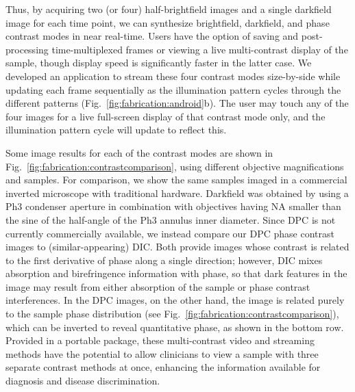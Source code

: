 Thus, by acquiring two (or four) half-brightfield images and a single darkfield image for each time point, we can synthesize brightfield, darkfield, and phase contrast modes in near real-time. Users have the option of saving and post-processing time-multiplexed frames or viewing a live multi-contrast display of the sample, though display speed is significantly faster in the latter case. We developed an application to stream these four contrast modes size-by-side while updating each frame sequentially as the illumination pattern cycles through the different patterns (Fig.~\ref{fig:fabrication:android}b). The user may touch any of the four images for a live full-screen display of that contrast mode only, and the illumination pattern cycle will update to reflect this.

Some image results for each of the contrast modes are shown in Fig.~\ref{fig:fabrication:contrastcomparison}, using different objective magnifications and samples. For comparison, we show the same samples imaged in a commercial inverted microscope with traditional hardware. Darkfield was obtained by using a Ph3 condenser aperture in combination with objectives having NA smaller than the sine of the half-angle of the Ph3 annulus inner diameter. Since DPC is not currently commercially available, we instead compare our DPC phase contrast images to (similar-appearing) DIC. Both provide images whose contrast is related to the first derivative of phase along a single direction; however, DIC mixes absorption and birefringence information with phase, so that dark features in the image may result from either absorption of the sample or phase contrast interferences. In the DPC images, on the other hand, the image is related purely to the sample phase distribution (see Fig.~\ref{fig:fabrication:contrastcomparison}), which can be inverted to reveal quantitative phase, as shown in the bottom row. Provided in a portable package, these multi-contrast video and streaming methods have the potential to allow clinicians to view a sample with three separate contrast methods at once, enhancing the information available for diagnosis and disease discrimination.

